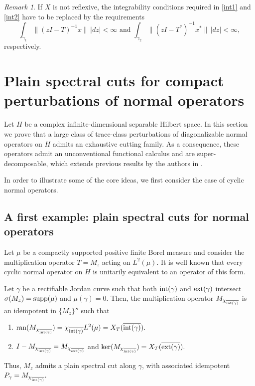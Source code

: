 \documentclass[11pt]{amsart}
\theoremstyle{definition}
\theoremstyle{remark}
\newtheorem{remark}[theorem]{Remark}
\numberwithin{equation}{section}
\newcommand{\ran}{\textnormal{ran}}
\newcommand{\supp}{\textnormal{supp}}
\newcommand{\biconm}[1]{{\{#1\}''}}
\newcommand{\inte}{\textnormal{int}}
\newcommand{\exte}{\textnormal{ext}}
\begin{document}
\begin{remark} If $X$ is not reflexive, the integrability conditions required in \eqref{int1} and \eqref{int2} have to be replaced by the requirements
$$
\int_{\gamma_1} \|(z I-T)^{-1}x\|\,|dz|<\infty \text{ and } \int_{\gamma_2} \|(z I-T^*)^{-1}x^*\|\,|dz|<\infty,
$$
respectively.
\end{remark}

\section{Plain spectral cuts for compact perturbations of normal operators}\label{sec 5}

Let $H$ be a complex infinite-dimensional separable Hilbert space. In this section we prove that a large class of trace-class perturbations of diagonalizable normal operators on $H$ admits an exhaustive cutting family. As a consequence, these operators admit an unconventional functional calculus and are super-decomposable, which extends previous results by the authors in \cite{GG3}.

In order to illustrate some of the core ideas, we first consider the case of cyclic normal operators.

\medskip

\subsection{A first example: plain spectral cuts for normal operators}
Let $\mu$ be a compactly supported positive finite Borel measure and consider the multiplication operator $T=M_z$ acting on $L^2(\mu)$.
It is well known that every cyclic normal operator on $H$ is unitarily equivalent to an operator of this form.

\smallskip

Let $\gamma$ be a rectifiable Jordan curve such that both $\inte(\gamma)$ and $\exte(\gamma)$ intersect $\sigma(M_z) = \supp(\mu)$ and $\mu(\gamma) = 0$. Then, the multiplication operator $M_{\chi_{\overline{\inte(\gamma)}}}$ is an idempotent in $\biconm{M_z}$ such that
\begin{enumerate}
    \item [(i)] $\ran(M_{\chi_{\overline{\inte(\gamma)}}}) = \chi_{\overline{\inte(\gamma)}}L^2(\mu) = X_T(\overline{\inte(\gamma)}).$
    \item [(ii)] $I-M_{\chi_{\overline{\inte(\gamma)}}} = M_{\chi_{\overline{\exte(\gamma)}}}$ and $\ker(M_{\chi_{\overline{\inte(\gamma)}}}) = X_T(\overline{\exte(\gamma)}).$
\end{enumerate}
Thus, $M_z$ admits a plain spectral cut along $\gamma$, with associated idempotent $P_\gamma = M_{\chi_{\overline{\inte(\gamma)}}}.$
\end{document}
